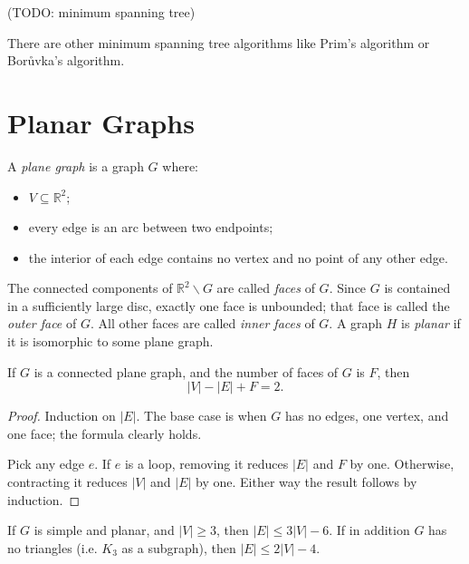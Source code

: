         (TODO: minimum spanning tree)
        
        There are other minimum spanning tree algorithms like Prim's algorithm or Borůvka's algorithm.
    
    \section{Planar Graphs}
        \begin{defn} \label{def_planar_graph}
            A \emph{plane graph} is a graph $G$ where: \begin{itemize}
                \item $V \subseteq \mathbb{R}^2$;
                \item every edge is an arc between two endpoints;
                \item the interior of each edge contains no vertex and no point of any other edge.
            \end{itemize}
            The connected components of $\mathbb{R}^2 \backslash G$ are called \emph{faces} of $G$. Since $G$ is contained in a sufficiently large disc, exactly one face is unbounded; that face is called the \emph{outer face} of $G$. All other faces are called \emph{inner faces} of $G$. A graph $H$ is \emph{planar} if it is isomorphic to some plane graph.
        \end{defn}
        
        \begin{thm} \label{thm_euler_vef}
            If $G$ is a connected plane graph, and the number of faces of $G$ is $F$, then \begin{displaymath}
                |V| - |E| + F = 2.
            \end{displaymath}
        \end{thm}
        
        \begin{proof}
            Induction on $|E|$. The base case is when $G$ has no edges, one vertex, and one face; the formula clearly holds.
            
            Pick any edge $e$. If $e$ is a loop, removing it reduces $|E|$ and $F$ by one. Otherwise, contracting it reduces $|V|$ and $|E|$ by one. Either way the result follows by induction.
        \end{proof}
        
        \begin{thm} \label{thm_planar_ve}
            If $G$ is simple and planar, and $|V| \geq 3$, then $|E| \leq 3|V|-6$. If in addition $G$ has no triangles (i.e. $K_3$ as a subgraph), then $|E| \leq 2|V|-4$.
        \end{thm}
        
